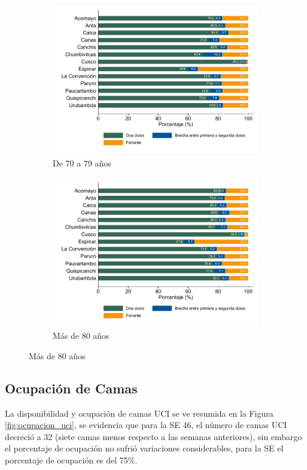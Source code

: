 \documentclass[12pt,a4paper,openany]{book}
\begin{document}
\begin{figure}[h]
\begin{subfigure}[b]{0.45\textwidth}
	\includegraphics[width=\textwidth]{../figuras/vacunacion_provincial_edad_6}
	\caption{De 70 a 79 años}
\end{subfigure}
\hfill
\begin{subfigure}[b]{0.45\textwidth}
	\centering
	\includegraphics[width=\textwidth]{../figuras/vacunacion_provincial_edad_7}
	\caption{Más de 80 años}
\end{subfigure}
\end{figure}

\clearpage
\subsection*{Ocupación de Camas}
\noindent La disponibilidad y ocupación de camas UCI se ve resumida en la Figura \ref{fig:ocupacion_uci}, se evidencia que para la SE 46, el número de camas UCI decreció a 32 (siete camas menos respecto a las semanas anteriores), sin embargo el porcentaje de ocupación no sufrió variaciones considerables, para la SE el porcentaje de ocupación es del 75$\%$. 
\end{document}
